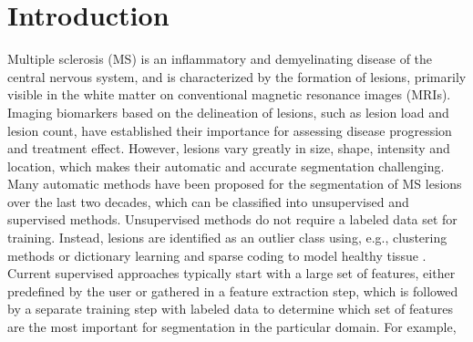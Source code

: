 \section{Introduction}


Multiple sclerosis (MS) is an inflammatory and demyelinating disease of the
central nervous system, and is characterized by the formation of lesions,
primarily visible in the white matter on conventional magnetic resonance images
(MRIs). Imaging biomarkers based on the delineation of lesions, such as lesion
load and lesion count, have established their importance for assessing disease
progression and treatment effect. However, lesions vary greatly in size, shape,
intensity and location, which makes their automatic and accurate segmentation
challenging. Many automatic methods have been proposed for the segmentation of
MS lesions over the last two decades, which can be classified into unsupervised
and supervised methods. Unsupervised methods do not require a labeled data set
for training. Instead, lesions are identified as an outlier class using, e.g.,
clustering methods \cite{souplet2008} or dictionary learning and sparse coding
to model healthy tissue \cite{weiss2013}. Current supervised approaches
typically start with a large set of features, either predefined by the user
\cite{geremia2010} or gathered in a feature extraction step, which is followed
by a separate training step with labeled data to determine which set of features
are the most important for segmentation in the particular domain. For example,
